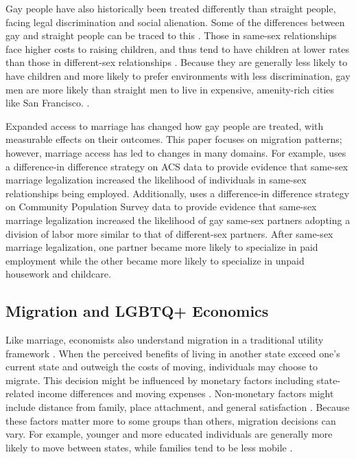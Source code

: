 \documentclass[12pt,letterpaper]{article}
\begin{document}
Gay people have also historically been treated differently than straight people, facing legal discrimination and social alienation. Some of the differences between gay and straight people can be traced to this \citep{2}. Those in same-sex relationships face higher costs to raising children, and thus tend to have children at lower rates than those in different-sex relationships \citep{8, 10, 11}. Because they are generally less likely to have children and  more likely to prefer environments with less discrimination, gay men are more likely than straight men to live in expensive, amenity-rich cities like San Francisco. \citep{7, 10, 11, 13}.

Expanded access to marriage has changed how gay people are treated, with measurable effects on their outcomes. This paper focuses on migration patterns; however, marriage access has led to changes in many domains. For example, \citet{3} uses a difference-in difference strategy on ACS data to provide evidence that same-sex marriage legalization increased the likelihood of individuals in same-sex relationships being employed. Additionally, \citet{30} uses a difference-in difference strategy on Community Population Survey data to provide evidence that same-sex marriage legalization increased the likelihood of gay same-sex partners adopting a division of labor more similar to that of different-sex partners. After same-sex marriage legalization,  one partner became more likely to specialize in paid employment while the other became more likely to specialize in unpaid housework and childcare. 

\subsection{Migration and LGBTQ+ Economics}
Like marriage, economists also understand migration in a traditional utility framework \citep{12}. When the perceived benefits of living in another state exceed one’s current state and outweigh the costs of moving, individuals may choose to migrate. This decision might be influenced by monetary factors including state-related income differences and moving expenses \citep{1, 15, 16, 17}. Non-monetary factors might include distance from family, place attachment, and general satisfaction \citep{1, 15}. Because these factors matter more to some groups than others, migration decisions can vary. For example, younger and more educated individuals are generally more likely to move between states, while families tend to be less mobile \citep{16, 17}.
\end{document}
